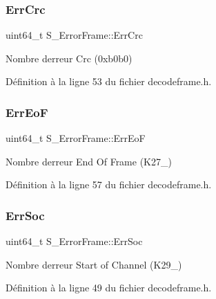 \subsubsection{\texorpdfstring{Err\+Crc}{ErrCrc}}
{\footnotesize\ttfamily uint64\+\_\+t S\+\_\+\+Error\+Frame\+::\+Err\+Crc}



Nombre d\textquotesingle{}erreur Crc (0xb0b0) 



Définition à la ligne 53 du fichier decodeframe.\+h.

\mbox{\label{struct_s___error_frame_a684de2c10638fec6d7d1895c4bb50f2a}} 
\subsubsection{\texorpdfstring{Err\+EoF}{ErrEoF}}
{\footnotesize\ttfamily uint64\+\_\+t S\+\_\+\+Error\+Frame\+::\+Err\+EoF}



Nombre d\textquotesingle{}erreur End Of Frame (K27\+\_) 



Définition à la ligne 57 du fichier decodeframe.\+h.

\mbox{\label{struct_s___error_frame_a35a6a18bbb7900d93a401c9ddbceb5c1}} 
\subsubsection{\texorpdfstring{Err\+Soc}{ErrSoc}}
{\footnotesize\ttfamily uint64\+\_\+t S\+\_\+\+Error\+Frame\+::\+Err\+Soc}



Nombre d\textquotesingle{}erreur Start of Channel (K29\+\_) 



Définition à la ligne 49 du fichier decodeframe.\+h.

\mbox{\label{struct_s___error_frame_afd3ab1e3e1a636c55f90b4aa13fa0629}} 
